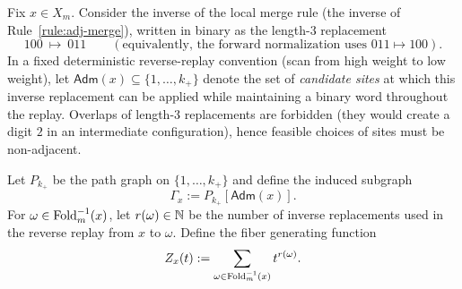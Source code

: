 \begin{definition}\label{def:fiber-adm-path}
Fix $x\in X_m$.
Consider the inverse of the local merge rule (the inverse of Rule~\eqref{rule:adj-merge}), written in binary as the length-$3$ replacement
\[
100\ \mapsto\ 011
\qquad
(\text{equivalently, the forward normalization uses }011\mapsto 100).
\]
In a fixed deterministic reverse-replay convention (scan from high weight to low weight), let $\mathsf{Adm}(x)\subseteq\{1,\dots,k_+\}$ denote the set of \emph{candidate sites} at which this inverse replacement can be applied while maintaining a binary word throughout the replay.
Overlaps of length-$3$ replacements are forbidden (they would create a digit $2$ in an intermediate configuration), hence feasible choices of sites must be non-adjacent.

Let $P_{k_+}$ be the path graph on $\{1,\dots,k_+\}$ and define the induced subgraph
\[
\Gamma_x:=P_{k_+}[\mathsf{Adm}(x)].
\]
For $\omega\in\mathrm{Fold}_m^{-1}(x)$, let $r(\omega)\in\mathbb{N}$ be the number of inverse replacements used in the reverse replay from $x$ to $\omega$.
Define the fiber generating function
\[
Z_x(t):=\sum_{\omega\in\mathrm{Fold}_m^{-1}(x)} t^{r(\omega)}.
\]
\end{definition}


